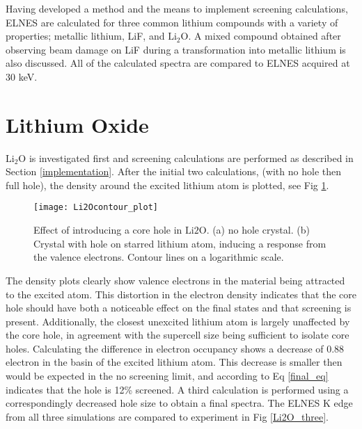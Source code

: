 
Having developed a method and the means to implement screening calculations, ELNES are calculated for three common lithium compounds with a variety of properties; metallic lithium, LiF, and  $\mathrm{Li_2O}$.  A mixed compound obtained after observing beam damage on LiF during a transformation into metallic lithium is also discussed.  All of the calculated spectra are compared to ELNES acquired at 30 keV.  




\section{Lithium Oxide}

 $ \mathrm{Li_2O} $ is investigated first and screening calculations are performed as described in Section \ref{implementation}.   After the initial two calculations, (with no hole then full hole), the density around the excited lithium atom is plotted, see Fig \ref{Li2O_contour}.  \\

\begin{figure}
	\centering
	\texttt{[image: Li2Ocontour\_plot]}
	\caption{Effect of introducing a core hole in $ \mathrm{Li2O} $.  (a) no hole crystal.  (b) Crystal with hole on starred lithium atom, inducing a response from the valence electrons.  Contour lines on a logarithmic scale. }
	\label{Li2O_contour}
\end{figure}

The density plots clearly show valence electrons in the material being attracted to the excited atom. This distortion in the electron density indicates that the core hole should have both a noticeable effect on the final states and that screening is present.  Additionally, the closest unexcited lithium atom is largely unaffected by the core hole, in agreement with the supercell size being sufficient to isolate core holes.  Calculating the difference in electron occupancy shows a decrease of 0.88 electron in the basin of the excited lithium atom.  This decrease is smaller then would be expected in the no screening limit, and according to Eq \ref{final_eq} indicates that the hole is 12\% screened.  A third calculation is performed using a correspondingly decreased hole size to obtain a final spectra.  The ELNES K edge from all three simulations are compared to experiment in Fig \ref{Li2O_three}.  \\

